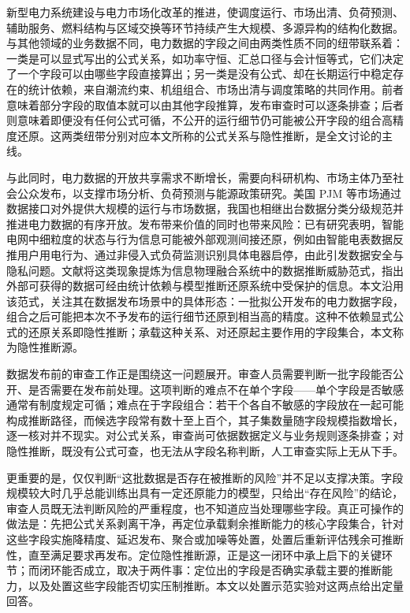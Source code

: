 \documentclass[UTF8,zihao=5,twoside]{ctexart}
\begin{document}
新型电力系统建设与电力市场化改革的推进，使调度运行、市场出清、负荷预测、辅助服务、燃料结构与区域交换等环节持续产生大规模、多源异构的结构化数据\cite{ref-liu-cps,ref-ma-pjm}。与其他领域的业务数据不同，电力数据的字段之间由两类性质不同的纽带联系着：一类是可以显式写出的公式关系，如功率守恒、汇总口径与会计恒等式，它们决定了一个字段可以由哪些字段直接算出；另一类是没有公式、却在长期运行中稳定存在的统计依赖，来自潮流约束、机组组合、市场出清与调度策略的共同作用。前者意味着部分字段的取值本就可以由其他字段推算，发布审查时可以逐条排查；后者则意味着即便没有任何公式可循，不公开的运行细节仍可能被公开字段的组合高精度还原。这两类纽带分别对应本文所称的公式关系与隐性推断，是全文讨论的主线。

与此同时，电力数据的开放共享需求不断增长，需要向科研机构、市场主体乃至社会公众发布，以支撑市场分析、负荷预测与能源政策研究\cite{ref-zhu-sharing}。美国 PJM 等市场通过数据接口对外提供大规模的运行与市场数据\cite{ref-ma-pjm,ref-pjm-dataminer}，我国也相继出台数据分类分级规范并推进电力数据的有序开放\cite{ref-gbt-classify}。发布带来价值的同时也带来风险：已有研究表明，智能电网中细粒度的状态与行为信息可能被外部观测间接还原，例如由智能电表数据反推用户用电行为\cite{ref-sankar,ref-giaconi}、通过非侵入式负荷监测识别具体电器启停\cite{ref-chen-privacy,ref-wang-meter}，由此引发数据安全与隐私问题\cite{ref-adewole,ref-zhang-sgcc}。文献\cite{ref-liu-data-inference}将这类现象提炼为信息物理融合系统中的数据推断威胁范式，指出外部可获得的数据可经由统计依赖与模型推断还原系统中受保护的信息。本文沿用该范式，关注其在数据发布场景中的具体形态：一批拟公开发布的电力数据字段，组合之后可能把本次不予发布的运行细节还原到相当高的精度。这种不依赖显式公式的还原关系即隐性推断；承载这种关系、对还原起主要作用的字段集合，本文称为隐性推断源。

数据发布前的审查工作正是围绕这一问题展开。审查人员需要判断一批字段能否公开、是否需要在发布前处理。这项判断的难点不在单个字段——单个字段是否敏感通常有制度规定可循；难点在于字段组合：若干个各自不敏感的字段放在一起可能构成推断路径，而候选字段常有数十至上百个，其子集数量随字段规模指数增长，逐一核对并不现实。对公式关系，审查尚可依据数据定义与业务规则逐条排查；对隐性推断，既没有公式可查，也无法从字段名称判断，人工审查实际上无从下手。

更重要的是，仅仅判断“这批数据是否存在被推断的风险”并不足以支撑决策。字段规模较大时几乎总能训练出具有一定还原能力的模型，只给出“存在风险”的结论，审查人员既无法判断风险的严重程度，也不知道应当处理哪些字段。真正可操作的做法是：先把公式关系剥离干净，再定位承载剩余推断能力的核心字段集合，针对这些字段实施降精度、延迟发布、聚合或加噪等处置，处置后重新评估残余可推断性，直至满足要求再发布。定位隐性推断源，正是这一闭环中承上启下的关键环节；而闭环能否成立，取决于两件事：定位出的字段是否确实承载主要的推断能力，以及处置这些字段能否切实压制推断。本文以处置示范实验对这两点给出定量回答。
\end{document}
